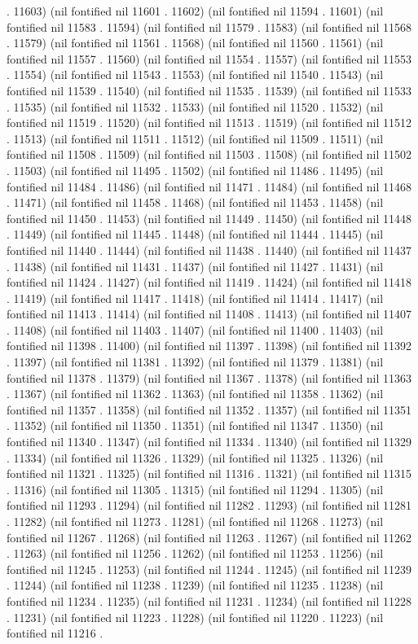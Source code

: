 . 11603) (nil fontified nil 11601 . 11602) (nil fontified nil 11594 . 11601) (nil fontified nil 11583 . 11594) (nil fontified nil 11579 . 11583) (nil fontified nil 11568 . 11579) (nil fontified nil 11561 . 11568) (nil fontified nil 11560 . 11561) (nil fontified nil 11557 . 11560) (nil fontified nil 11554 . 11557) (nil fontified nil 11553 . 11554) (nil fontified nil 11543 . 11553) (nil fontified nil 11540 . 11543) (nil fontified nil 11539 . 11540) (nil fontified nil 11535 . 11539) (nil fontified nil 11533 . 11535) (nil fontified nil 11532 . 11533) (nil fontified nil 11520 . 11532) (nil fontified nil 11519 . 11520) (nil fontified nil 11513 . 11519) (nil fontified nil 11512 . 11513) (nil fontified nil 11511 . 11512) (nil fontified nil 11509 . 11511) (nil fontified nil 11508 . 11509) (nil fontified nil 11503 . 11508) (nil fontified nil 11502 . 11503) (nil fontified nil 11495 . 11502) (nil fontified nil 11486 . 11495) (nil fontified nil 11484 . 11486) (nil fontified nil 11471 . 11484) (nil fontified nil 11468 . 11471) (nil fontified nil 11458 . 11468) (nil fontified nil 11453 . 11458) (nil fontified nil 11450 . 11453) (nil fontified nil 11449 . 11450) (nil fontified nil 11448 . 11449) (nil fontified nil 11445 . 11448) (nil fontified nil 11444 . 11445) (nil fontified nil 11440 . 11444) (nil fontified nil 11438 . 11440) (nil fontified nil 11437 . 11438) (nil fontified nil 11431 . 11437) (nil fontified nil 11427 . 11431) (nil fontified nil 11424 . 11427) (nil fontified nil 11419 . 11424) (nil fontified nil 11418 . 11419) (nil fontified nil 11417 . 11418) (nil fontified nil 11414 . 11417) (nil fontified nil 11413 . 11414) (nil fontified nil 11408 . 11413) (nil fontified nil 11407 . 11408) (nil fontified nil 11403 . 11407) (nil fontified nil 11400 . 11403) (nil fontified nil 11398 . 11400) (nil fontified nil 11397 . 11398) (nil fontified nil 11392 . 11397) (nil fontified nil 11381 . 11392) (nil fontified nil 11379 . 11381) (nil fontified nil 11378 . 11379) (nil fontified nil 11367 . 11378) (nil fontified nil 11363 . 11367) (nil fontified nil 11362 . 11363) (nil fontified nil 11358 . 11362) (nil fontified nil 11357 . 11358) (nil fontified nil 11352 . 11357) (nil fontified nil 11351 . 11352) (nil fontified nil 11350 . 11351) (nil fontified nil 11347 . 11350) (nil fontified nil 11340 . 11347) (nil fontified nil 11334 . 11340) (nil fontified nil 11329 . 11334) (nil fontified nil 11326 . 11329) (nil fontified nil 11325 . 11326) (nil fontified nil 11321 . 11325) (nil fontified nil 11316 . 11321) (nil fontified nil 11315 . 11316) (nil fontified nil 11305 . 11315) (nil fontified nil 11294 . 11305) (nil fontified nil 11293 . 11294) (nil fontified nil 11282 . 11293) (nil fontified nil 11281 . 11282) (nil fontified nil 11273 . 11281) (nil fontified nil 11268 . 11273) (nil fontified nil 11267 . 11268) (nil fontified nil 11263 . 11267) (nil fontified nil 11262 . 11263) (nil fontified nil 11256 . 11262) (nil fontified nil 11253 . 11256) (nil fontified nil 11245 . 11253) (nil fontified nil 11244 . 11245) (nil fontified nil 11239 . 11244) (nil fontified nil 11238 . 11239) (nil fontified nil 11235 . 11238) (nil fontified nil 11234 . 11235) (nil fontified nil 11231 . 11234) (nil fontified nil 11228 . 11231) (nil fontified nil 11223 . 11228) (nil fontified nil 11220 . 11223) (nil fontified nil 11216 . 